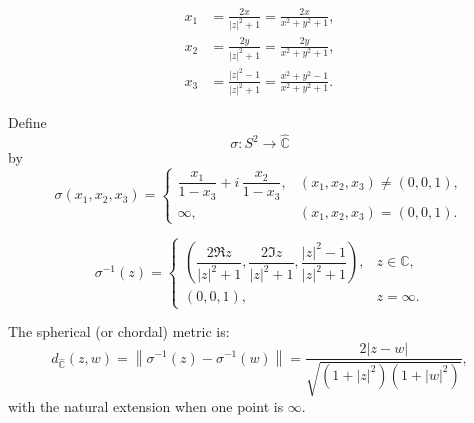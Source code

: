 \documentclass[
]{book}
\theoremstyle{definition}
\theoremstyle{definition}
\theoremstyle{definition}
\theoremstyle{definition}
\theoremstyle{remark}
\begin{document}
\[
\begin{align*}
x_1 &= \frac{2x}{|z|^2+1}
     = \frac{2x}{x^2 + y^2 + 1},\\
x_2 &= \frac{2y}{|z|^2+1}
     = \frac{2y}{x^2 + y^2 + 1},\\
x_3 &= \frac{|z|^2-1}{|z|^2+1}
     = \frac{x^2 + y^2 - 1}{x^2 + y^2 + 1}.
\end{align*}
\]

Define
\[
\sigma : S^2 \to \widehat{\mathbb{C}}
\]
by
\[
\sigma(x_1,x_2,x_3) =
\begin{cases}
\dfrac{x_1}{1 - x_3} + i\,\dfrac{x_2}{1 - x_3}, & (x_1,x_2,x_3) \neq (0,0,1), \\[1em]
\infty, & (x_1,x_2,x_3) = (0,0,1).
\end{cases}
\]

\[
\sigma^{-1}(z) =
\begin{cases}
\left(
\dfrac{2\Re z}{|z|^2 + 1},
\dfrac{2\Im z}{|z|^2 + 1},
\dfrac{|z|^2 - 1}{|z|^2 + 1}
\right), & z \in \mathbb{C}, \\[1em]
(0,0,1), & z = \infty.
\end{cases}
\]

The spherical (or chordal) metric is:
\[
d_{\widehat{\mathbb{C}}}(z,w)
= \left\|\sigma^{-1}(z) - \sigma^{-1}(w)\right\|
= \frac{2|z-w|}{\sqrt{(1+|z|^2)(1+|w|^2)}},
\]
with the natural extension when one point is \(\infty\).


\end{document}
